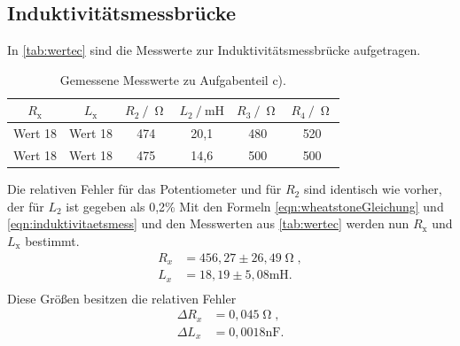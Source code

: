 \subsection{Induktivitätsmessbrücke}
In \autoref{tab:wertec} sind die Messwerte zur Induktivitätsmessbrücke aufgetragen.
\begin{table}[H]
  \centering
  \caption{Gemessene Messwerte zu Aufgabenteil c).}
  \label{tab:wertec}
  \begin{tabular}{c c c c c c}
    \toprule
    $R_{\text{x}}$ & $L_{\text{x}}$ & $R_{\text{2}} \:/\: \upOmega$ & $L_{\text{2}} \:/\: \si{\milli\henry}$ & $R_{\text{3}} \:/\: \upOmega$ & $R_{\text{4}} \:/\: \upOmega$ \\
    \midrule
    Wert 18 & Wert 18 & 474 & 20,1 & 480 & 520 \\
    Wert 18 & Wert 18 & 475 & 14,6 & 500 & 500 \\
    \bottomrule
  \end{tabular}
\end{table}
Die relativen Fehler für das Potentiometer und für $R_2$ sind identisch wie vorher, der für $L_2$ ist gegeben als 0,2\%
Mit den Formeln \autoref{eqn:wheatstoneGleichung} und \autoref{eqn:induktivitaetsmess} und den Messwerten aus \autoref{tab:wertec} werden nun $R_{\text{x}}$
und $L_{\text{x}}$ bestimmt.
\begin{align*}
  R_x &= 456,27 \pm 26,49 \upOmega, \\
  L_x &= 18,19 \pm 5,08 \si{\milli\henry} . \\
\end{align*}
Diese Größen besitzen die relativen Fehler
\begin{align*}
  \Delta R_x &= 0,045 \upOmega, \\
  \Delta L_x &= 0,0018 \si{\nano\farad} . \\
\end{align*}


